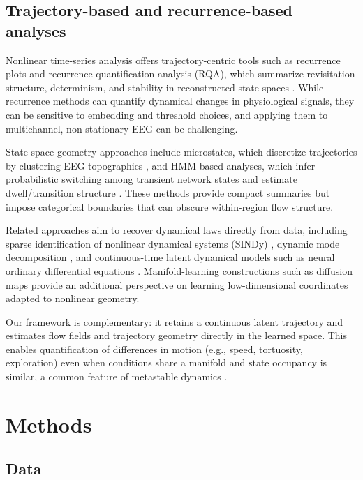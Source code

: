 \documentclass[5p,twocolumn,authoryear]{elsarticle}
\begin{document}
\subsection{Trajectory-based and recurrence-based analyses}

Nonlinear time-series analysis offers trajectory-centric tools such as recurrence plots and recurrence quantification analysis (RQA), which summarize revisitation structure, determinism, and stability in reconstructed state spaces \citep{Marwan2007}. While recurrence methods can quantify dynamical changes in physiological signals, they can be sensitive to embedding and threshold choices, and applying them to multichannel, non-stationary EEG can be challenging.

State-space geometry approaches include microstates, which discretize trajectories by clustering EEG topographies \citep{Michel2018}, and HMM-based analyses, which infer probabilistic switching among transient network states and estimate dwell/transition structure \citep{Baker2014,Vidaurre2018}. These methods provide compact summaries but impose categorical boundaries that can obscure within-region flow structure.

Related approaches aim to recover dynamical laws directly from data, including sparse identification of nonlinear dynamical systems (SINDy) \citep{Brunton2016}, dynamic mode decomposition \citep{Schmid2010DMD}, and continuous-time latent dynamical models such as neural ordinary differential equations \citep{Chen2018}. Manifold-learning constructions such as diffusion maps \citep{CoifmanLafon2006} provide an additional perspective on learning low-dimensional coordinates adapted to nonlinear geometry.

Our framework is complementary: it retains a continuous latent trajectory and estimates flow fields and trajectory geometry directly in the learned space. This enables quantification of differences in motion (e.g., speed, tortuosity, exploration) even when conditions share a manifold and state occupancy is similar, a common feature of metastable dynamics \citep{TognoliKelso2014,Deco2017}.

\section{Methods}

\subsection{Data}
\end{document}
